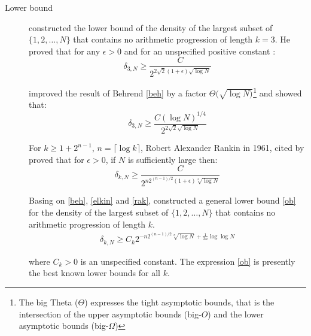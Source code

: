\begin{description}
\item[Lower bound]
\cite{behrend1946sets} constructed the lower bound of the density of the largest subset of $\{1,2, \ldots, N\}$ that contains no arithmetic progression of length $k=3$. He proved that for any $\epsilon >0$ and for an unspecified positive constant :
\begin{equation}
\delta_{3,N} \geq \frac{C}{2^{2\sqrt{2}(1+\epsilon) \sqrt{\log N}}} \label{beh}
\end{equation}

\cite{elkin2010improved} improved the result of Behrend \eqref{beh} by a factor $\Theta (\sqrt{\log N)}$\footnote{The big Theta ($\Theta$) expresses the tight asymptotic  bounds, that is the intersection of  the upper asymptotic bounds (big-$O$) and the lower asymptotic bounds (big-$\Omega$) } and showed that:
\begin{equation}
\delta_{3,N} \geq \frac{C (\log N)^{1/4}}{2^{2\sqrt{2} \sqrt{\log N}}} \label{elkin}
\end{equation}

For $k \geq 1+2^{n-1}$,  $n=\lceil \log k \rceil$, Robert Alexander Rankin in 1961, cited by \cite{o2011sets} proved that for $\epsilon >0$,  if $N$ is sufficiently large then:
\begin{equation}
\delta_{k,N} \geq \frac{C}{2^{n2^{(n-1)/2}(1+\epsilon) \sqrt[n]{\log N}}} \label{rak}
\end{equation}


Basing on \eqref{beh}, \eqref{elkin} and \eqref{rak}, \cite{o2011sets} constructed  a general lower bound \eqref{ob} for the density of the largest subset of $\{1,2, \ldots, N\}$ that contains no arithmetic progression of length $k.$
\begin{align}
\delta_{k,N} \geq C_k 2^{-n2^{(n-1)/2} \sqrt[n]{\log N} +\frac{1}{2n} \log \log N } \label{ob}
\end{align}

where $C_k >0$ is an unspecified constant. The expression \eqref{ob} is presently the best known  lower bounds for all $k.$


\end{description}
